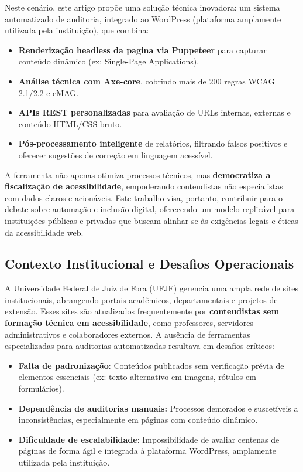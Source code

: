 \documentclass[12pt]{article}
\begin{document}
Neste cenário, este artigo propõe uma solução técnica inovadora: um sistema
automatizado de auditoria, integrado ao WordPress (plataforma amplamente utilizada
pela instituição), que combina:

\begin{itemize}
\item \textbf{Renderização headless da pagina via Puppeteer} para capturar conteúdo
dinâmico (ex: Single-Page Applications).\cite{puppeteer}
\item \textbf{Análise técnica com Axe-core\cite{axecore}}, cobrindo mais de 200 regras WCAG 2.1/2.2 e eMAG.\@
\item \textbf{APIs REST personalizadas} para avaliação de URLs internas, externas e
conteúdo HTML/CSS bruto.
\item \textbf{Pós-processamento inteligente} de relatórios, filtrando falsos
positivos e oferecer sugestões de correção em linguagem acessível.
\end{itemize}

A ferramenta não apenas otimiza processos técnicos, mas \textbf{democratiza a
fiscalização de acessibilidade}, empoderando conteudistas não especialistas com
dados claros e acionáveis. Este trabalho visa, portanto, contribuir para o debate 
sobre automação e inclusão digital, oferecendo um modelo replicável para instituições
públicas e privadas que buscam alinhar-se às exigências legais e éticas da
acessibilidade web.

\subsection{Contexto Institucional e Desafios Operacionais}\label{subsec:contexto}
A Universidade Federal de Juiz de Fora (UFJF) gerencia uma ampla rede de sites
institucionais, abrangendo portais acadêmicos, departamentais e projetos de extensão.
Esses sites são atualizados frequentemente por \textbf{conteudistas sem formação 
técnica em acessibilidade}, como professores, servidores administrativos e
colaboradores externos. A ausência de ferramentas especializadas para auditorias 
automatizadas resultava em desafios críticos:

\begin{itemize}
\item \textbf{Falta de padronização}: Conteúdos publicados sem verificação prévia de
elementos essenciais (ex: texto alternativo em imagens, rótulos em formulários).
\item \textbf{Dependência de auditorias manuais:} Processos demorados e suscetíveis 
a inconsistências, especialmente em páginas com conteúdo 
dinâ\-mico.
\item \textbf{Dificuldade de escalabilidade}: Impossibilidade de avaliar centenas de páginas de forma ágil e integrada à plataforma WordPress, amplamente utilizada pela
instituição.
\end{itemize}
\end{document}
